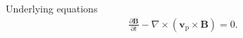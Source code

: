 \documentclass[10pt,aspectratio=169,usenames,dvipsnames]{beamer}
\begin{document}
\begin{frame}{Underlying equations}
\begin{gather}
\frac{\partial \textbf{B}}{\partial t} - \nabla \times (\textbf{v}_{\text{p}} \times \textbf{B}) = 0.\tag{11}
\end{gather}
\end{frame}

\end{document}
